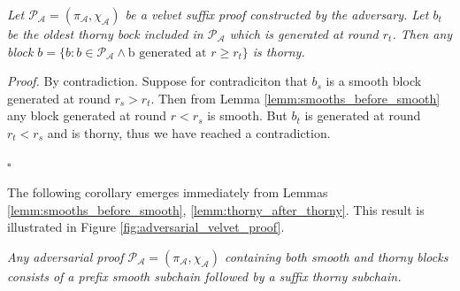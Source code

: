 \begin{lemma}
	\textit{Let $\mathcal{P_A} = (\pi_\mathcal{A}, \chi_\mathcal{A})$ be a velvet suffix proof constructed by the adversary. Let $b_t$ be the oldest thorny bock included in $\mathcal{P_A}$ which is generated at round $r_t$. Then any block $b = \{b: b \in \mathcal{P_A} \wedge \text{b generated at }r \geq r_t \}$ is thorny.}
	\label{lemm:thorny_after_thorny}
\end{lemma}
\textit{Proof.} By contradiction. Suppose for contradiciton that $b_s$ is a smooth block generated at round $r_s > r_t$. Then from Lemma \ref{lemm:smooths_before_smooth} any block generated at round $r < r_s$ is smooth. But $b_t$ is generated at round $r_t < r_s$ and is thorny, thus we have reached a contradiction.
\begin{flushright}
$\square$
\end{flushright}

The following corollary emerges immediately from Lemmas \ref{lemm:smooths_before_smooth}, \ref{lemm:thorny_after_thorny}. This result is illustrated in Figure \ref{fig:adversarial_velvet_proof}.

\begin{corollary}
	\textit{Any adversarial proof $\mathcal{P_A} = (\pi_\mathcal{A}, \chi_\mathcal{A})$ containing both smooth and thorny blocks consists of a prefix smooth subchain followed by a suffix thorny subchain.}
	\label{cor:adversarial_proof_scheme}
\end{corollary}

